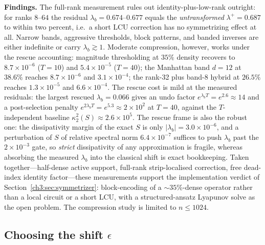 \noindent\textbf{Findings.}  The full-rank measurement rules out
identity-plus-low-rank outright: for ranks $8$--$64$ the residual
$\lambda_b=0.674$--$0.677$ equals the \emph{untransformed}
$\lambda^{+}=0.687$ to within two percent, i.e.\ a short LCU
correction has no symmetrizing effect at all.  Narrow bands,
aggressive thresholds, block patterns, and banded inverses are either
indefinite or carry $\lambda_b\gtrsim1$.  Moderate compression,
however, works under the rescue accounting: magnitude thresholding at
$35\%$ density recovers to $8.7\times10^{-6}$ ($T=10$) and
$5.4\times10^{-5}$ ($T=40$); the Manhattan band $d=12$ at $38.6\%$
reaches $8.7\times10^{-6}$ and $3.1\times10^{-4}$; the rank-32 plus
band-8 hybrid at $26.5\%$ reaches $1.3\times10^{-5}$ and
$6.6\times10^{-4}$.  The rescue cost is mild at the measured
residuals: the largest rescued $\lambda_b=0.066$ gives an undo factor
$e^{\lambda_bT}=e^{2.6}\approx14$ and a post-selection penalty
$e^{2\lambda_bT}=e^{5.3}\approx2\times10^{2}$ at $T=40$, against the
$T$-independent baseline $\kappa_2^{2}(S)\approx2.6\times10^{5}$.  The
rescue frame is also the robust one: the dissipativity margin of the
exact $S$ is only $|\lambda_b|=3.0\times10^{-6}$, and a perturbation
of $S$ of relative spectral norm $6.4\times10^{-7}$ suffices to push
$\lambda_b$ past the $2\times10^{-3}$ gate, so \emph{strict}
dissipativity of any approximation is fragile, whereas absorbing the
measured $\lambda_b$ into the classical shift is exact bookkeeping.
Taken together---half-dense active support, full-rank strip-localised
correction, free dead-index identity factor---these measurements
support the implementation verdict of Section~\ref{ch3:sec:symmetrizer}:
block-encoding of a ${\sim}35\%$-dense operator rather than a local
circuit or a short LCU, with a structured-ansatz Lyapunov solve as the
open problem.  The compression study is limited to $n\le1024$.

\subsection{Choosing the shift \texorpdfstring{$\epsilon$}{epsilon}}
\label{ch3:appE:eps}

